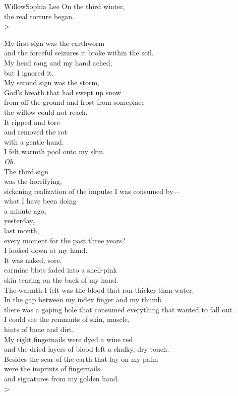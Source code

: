 \begin{poetry}{Willow}{Sophia Lee}
    On the third winter,\\
    the real torture began.\\>
    
    My first sign was the earthworm\\
    and the forceful seizures it broke within the soil.\\
    My head rang and my hand ached,\\
    but I ignored it.\\
    My second sign was the storm,\\
    God's breath that had swept up snow\\
    from off the ground and frost from someplace\\
    the willow could not reach.\\
    It ripped and tore\\
    and removed the rot\\
    with a gentle hand.\\
    I felt warmth pool onto my skin.\\
    \tab{}\textit{Oh.}\\
    The third sign\\
    was the horrifying,\\
    sickening realization of the impulse I was consumed by—\\
    what I have been doing\\
    a minute ago,\\
    yesterday,\\
    last month,\\
    every moment for the past three years?\\
    I looked down at my hand.\\
    It was naked, sore,\\
    carmine blots faded into a shell-pink\\
    skin tearing on the back of my hand.\\
    The warmth I felt was the blood that ran thicker than water.\\
    In the gap between my index finger and my thumb\\
    there was a gaping hole that consumed everything that wanted to fall out.\\
    I could see the remnants of skin, muscle,\\
    hints of bone and dirt.\\
    My right fingernails were dyed a wine red\\
    and the dried layers of blood left a chalky, dry touch.\\
    Besides the scar of the earth that lay on my palm\\
    were the imprints of fingernails\\
    and signatures from my golden hand.\\>
    

\end{poetry}
